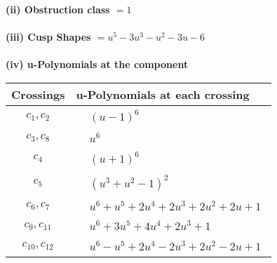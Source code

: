 \documentclass[1p]{elsarticle_modified}
\theoremstyle{definition}
\begin{document}
\flushleft \textbf{(ii) Obstruction class $= 1$}\\~\\
\flushleft \textbf{(iii) Cusp Shapes $= u^5-3 u^3- u^2-3 u-6$}\\~\\
\newpage\renewcommand{\arraystretch}{1}
\flushleft \textbf{(iv) u-Polynomials at the component}\newline \\
\begin{tabular}{m{50pt}|m{274pt}}
Crossings & \hspace{64pt}u-Polynomials at each crossing \\
\hline $$\begin{aligned}c_{1},c_{2}\end{aligned}$$&$\begin{aligned}
&(u-1)^6
\end{aligned}$\\
\hline $$\begin{aligned}c_{3},c_{8}\end{aligned}$$&$\begin{aligned}
&u^6
\end{aligned}$\\
\hline $$\begin{aligned}c_{4}\end{aligned}$$&$\begin{aligned}
&(u+1)^6
\end{aligned}$\\
\hline $$\begin{aligned}c_{5}\end{aligned}$$&$\begin{aligned}
&(u^3+u^2-1)^2
\end{aligned}$\\
\hline $$\begin{aligned}c_{6},c_{7}\end{aligned}$$&$\begin{aligned}
&u^6+u^5+2 u^4+2 u^3+2 u^2+2 u+1
\end{aligned}$\\
\hline $$\begin{aligned}c_{9},c_{11}\end{aligned}$$&$\begin{aligned}
&u^6+3 u^5+4 u^4+2 u^3+1
\end{aligned}$\\
\hline $$\begin{aligned}c_{10},c_{12}\end{aligned}$$&$\begin{aligned}
&u^6- u^5+2 u^4-2 u^3+2 u^2-2 u+1
\end{aligned}$\\
\hline
\end{tabular}\\~\\
\end{document}
